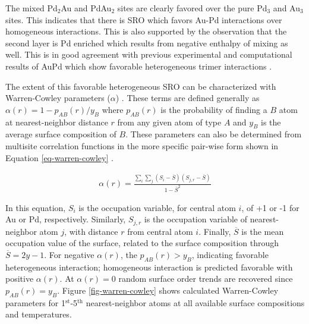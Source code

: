 \documentclass[12pt]{cmuthesis}
\begin{document}
The mixed Pd\(_{\text{2}}\)Au and PdAu\(_{\text{2}}\) sites are clearly favored over the pure Pd\(_{\text{3}}\) and Au\(_{\text{3}}\) sites. This indicates that there is SRO which favors Au-Pd interactions over homogeneous interactions. This is also supported by the observation that the second layer is Pd enriched which results from negative enthalpy of mixing as well. This is in good agreement with previous experimental and computational results of AuPd which show favorable heterogeneous trimer interactions \cite{sadigh-1999-short-range}.

The extent of this favorable heterogeneous SRO can be characterized with Warren-Cowley parameters (\(\alpha\)) \cite{cowley-1950-x-ray,warren-1990-x,engstfeld-2012-format-atomic}. These terms are defined generally as \(\alpha(r) = 1 - p_{AB}(r)/y_{B}\) where \(p_{AB}(r)\) is the probability of finding a \(B\) atom at nearest-neighbor distance \(r\) from any given atom of type \(A\) and \(y_{B}\) is the average surface composition of \(B\). These parameters can also be determined from multisite correlation functions in the more specific pair-wise form shown in Equation \ref{eq-warren-cowley} \cite{sadigh-1999-short-range}.

\begin{eqnarray} \label{eq-warren-cowley}
\alpha(r) = \frac{\sum_{i}\sum_{j}(S_{i} - \overline{S})(S_{j,r} - \overline{S})}{1 - \overline{S}^{2}}
\end{eqnarray}

In this equation, \(S_{i}\) is the occupation variable, for central atom \(i\), of +1 or -1 for Au or Pd, respectively. Similarly, \(S_{j,r}\) is the occupation variable of nearest-neighbor atom \(j\), with distance \(r\) from central atom \(i\). Finally, \(\overline{S}\) is the mean occupation value of the surface, related to the surface composition through \(\overline{S} = 2y - 1\). For negative \(\alpha(r)\), the \(p_{AB}(r) > y_{B}\), indicating favorable heterogeneous interaction; homogeneous interaction is predicted favorable with positive \(\alpha(r)\). At \(\alpha(r) = 0\) random surface order trends are recovered since \(p_{AB}(r) = y_{B}\). Figure \ref{fig-warren-cowley} shows calculated Warren-Cowley parameters for 1\(^{\text{st}}\)-5\(^{\text{th}}\) nearest-neighbor atoms at all available surface compositions and temperatures.
\end{document}
